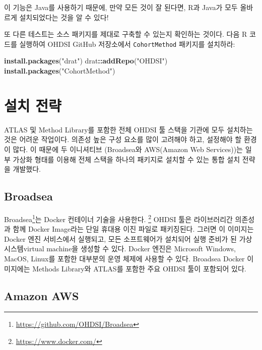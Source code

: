 \documentclass[10.5pt]{book}
\newenvironment{Shaded}{\begin{snugshade}}{\end{snugshade}}
\newcommand{\KeywordTok}[1]{\textcolor[rgb]{0.13,0.29,0.53}{\textbf{#1}}}
\newcommand{\StringTok}[1]{\textcolor[rgb]{0.31,0.60,0.02}{#1}}
\newcommand{\OperatorTok}[1]{\textcolor[rgb]{0.81,0.36,0.00}{\textbf{#1}}}
\newcommand{\NormalTok}[1]{#1}
\let\rmarkdownfootnote\footnote%
\def\footnote{\protect\rmarkdownfootnote}
\theoremstyle{definition}
\theoremstyle{definition}
\theoremstyle{definition}
\theoremstyle{remark}
\begin{document}
이 기능은 Java를 사용하기 때문에, 만약 모든 것이 잘 된다면, R과 Java가
모두 올바르게 설치되었다는 것을 알 수 있다!

또 다른 테스트는 소스 패키지를 제대로 구축할 수 있는지 확인하는 것이다.
다음 R 코드를 실행하여 OHDSI GitHub 저장소에서 \texttt{CohortMethod}
패키지를 설치하라:

\begin{Shaded}
\begin{Highlighting}[]
\KeywordTok{install.packages}\NormalTok{(}\StringTok{"drat"}\NormalTok{)}
\NormalTok{drat}\OperatorTok{::}\KeywordTok{addRepo}\NormalTok{(}\StringTok{"OHDSI"}\NormalTok{)}
\KeywordTok{install.packages}\NormalTok{(}\StringTok{"CohortMethod"}\NormalTok{)}
\end{Highlighting}
\end{Shaded}

\section{설치 전략}\label{-}

ATLAS 및 Method Library를 포함한 전체 OHDSI 툴 스택을 기관에 모두
설치하는 것은 어려운 작업이다. 의존성 높은 구성 요소를 많이 고려해야
하고, 설정해야 할 환경이 많다. 이 때문에 두 이니셔티브 (Broadsea와
AWS(Amazon Web Services))는 일부 가상화 형태를 이용해 전체 스택을 하나의
패키지로 설치할 수 있는 통합 설치 전략을 개발했다.

\subsection{Broadsea}\label{broadsea}

Broadsea\footnote{\url{https://github.com/OHDSI/Broadsea}}는 Docker
컨테이너 기술을 사용한다. \footnote{\url{https://www.docker.com/}} OHDSI
툴은 라이브러리간 의존성과 함께 Docker Image라는 단일 휴대용 이진 파일로
패키징된다. 그러면 이 이미지는 Docker 엔진 서비스에서 실행되고, 모든
소프트웨어가 설치되어 실행 준비가 된 가상 시스템virtual machine을 생성할
수 있다. Docker 엔진은 Microsoft Windows, MacOS, Linux를 포함한 대부분의
운영 체제에 사용할 수 있다. Broadsea Docker 이미지에는 Methods Library와
ATLAS를 포함한 주요 OHDSI 툴이 포함되어 있다.

\subsection{Amazon AWS}\label{amazon-aws}
\end{document}

